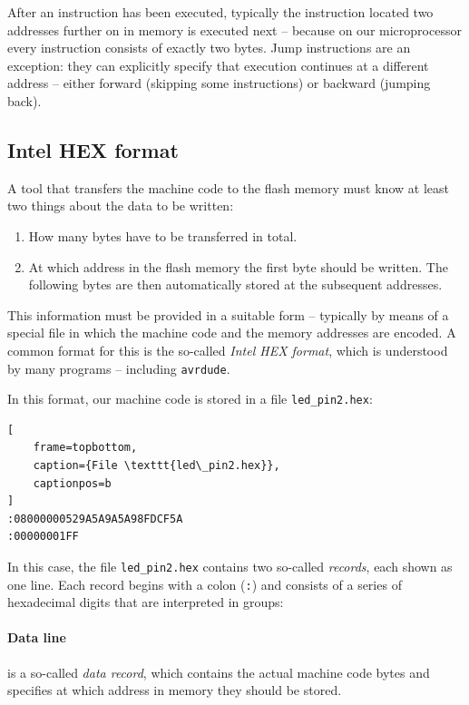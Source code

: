 \documentclass[a4paper,12pt]{article}
\begin{document}
After an instruction has been executed, typically the instruction located two
addresses further on in memory is executed next – because on our
microprocessor every instruction consists of exactly two bytes. Jump
instructions are an exception: they can explicitly specify that execution
continues at a different address – either forward (skipping some
instructions) or backward (jumping back).

\subsection{Intel HEX format}
A tool that transfers the machine code to the flash memory must know at least
two things about the data to be written:

\begin{enumerate}
    \item
	How many bytes have to be transferred in total.
    \item
	At which address in the flash memory the first byte should be written.
	The following bytes are then automatically stored at the subsequent
	addresses.
\end{enumerate}
This information must be provided in a suitable form – typically by means of
a special file in which the machine code and the memory addresses are
encoded. A common format for this is the so-called \emph{Intel HEX format},
which is understood by many programs – including \texttt{avrdude}.

In this format, our machine code is stored in a file \texttt{led\_pin2.hex}:

\vspace{15bp}
\begin{lstlisting}[
    frame=topbottom,
    caption={File \texttt{led\_pin2.hex}},
    captionpos=b
]
:08000000529A5A9A5A98FDCF5A
:00000001FF
\end{lstlisting}

\noindent
In this case, the file \texttt{led\_pin2.hex} contains two so-called
\emph{records}, each shown as one line. Each record begins with a colon
(\texttt{:}) and consists of a series of hexadecimal digits that are
interpreted in groups:

\paragraph{Data line}

is a so-called \emph{data record}, which contains the actual machine code
bytes and specifies at which address in memory they should be stored.
\end{document}
